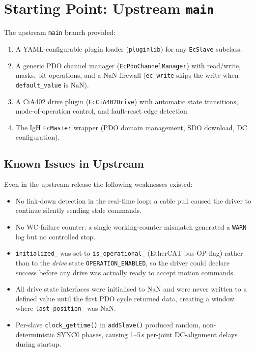 \documentclass[11pt,a4paper]{article}
\begin{document}
\section{Starting Point: Upstream \texttt{main}}
\label{sec:upstream}

The upstream \texttt{main} branch provided:
\begin{enumerate}[nosep]
  \item A YAML-configurable plugin loader (\texttt{pluginlib}) for any
        \texttt{EcSlave} subclass.
  \item A generic PDO channel manager (\texttt{EcPdoChannelManager}) with
        read/write, masks, bit operations, and a NaN firewall
        (\texttt{ec\_write} skips the write when \texttt{default\_value} is
        NaN).
  \item A CiA402 drive plugin (\texttt{EcCiA402Drive}) with automatic state
        transitions, mode-of-operation control, and fault-reset edge detection.
  \item The IgH \texttt{EcMaster} wrapper (PDO domain management, SDO
        download, DC configuration).
\end{enumerate}

\subsection{Known Issues in Upstream}
\label{sec:upstream-issues}

Even in the upstream release the following weaknesses existed:

\begin{warnbox}[title=Upstream limitations]
  \begin{itemize}[nosep]
    \item No link-down detection in the real-time loop: a cable pull caused
          the driver to continue silently sending stale commands.
    \item No WC-failure counter: a single working-counter mismatch generated a
          \texttt{WARN} log but no controlled stop.
    \item \texttt{initialized\_} was set to \texttt{is\_operational\_}
          (EtherCAT bus-OP flag) rather than to the \emph{drive} state
          \texttt{OPERATION\_ENABLED}, so the driver could declare success before
          any drive was actually ready to accept motion commands.
    \item All drive state interfaces were initialised to NaN and were never
          written to a defined value until the first PDO cycle returned data,
          creating a window where \texttt{last\_position\_} was NaN.
    \item Per-slave \texttt{clock\_gettime()} in \texttt{addSlave()} produced
          random, non-deterministic SYNC0 phases, causing 1--5\,s per-joint
          DC-alignment delays during startup.
  \end{itemize}
\end{warnbox}
\end{document}
